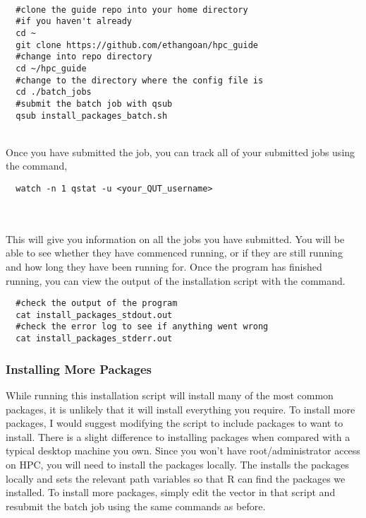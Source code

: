 %
%
\\
\par
\begin{verbatim}
  #clone the guide repo into your home directory
  #if you haven't already
  cd ~
  git clone https://github.com/ethangoan/hpc_guide
  #change into repo directory
  cd ~/hpc_guide
  #change to the directory where the config file is
  cd ./batch_jobs
  #submit the batch job with qsub
  qsub install_packages_batch.sh
\end{verbatim}
\\
%
Once you have submitted the job, you can track all of your submitted jobs using the command,
%
\\
\par
\begin{verbatim}
  watch -n 1 qstat -u <your_QUT_username>
\end{verbatim}
%
\\
\\
% 
This will give you information on all the jobs you have submitted. You will be able to see whether they have commenced running, or if they are still running and how long they have been running for. Once the program has finished running, you can view the output of the installation script with the  command.
\\
\par
\begin{verbatim}
  #check the output of the program
  cat install_packages_stdout.out
  #check the error log to see if anything went wrong
  cat install_packages_stderr.out
\end{verbatim}
%
%
%
\subsubsection{Installing More Packages}
%
%
While running this installation script will install many of the most common packages, it is unlikely that it will install everything you require. To install more packages, I would suggest modifying the  script to include packages to want to install. There is a slight difference to installing packages when compared with a typical desktop machine you own. Since you won't have root/administrator access on HPC, you will need to install the packages locally. The  installs the packages locally and sets the relevant path variables so that R can find the packages we installed. To install more packages, simply edit the  vector in that script and resubmit the batch job using the same commands as before.
%
%
